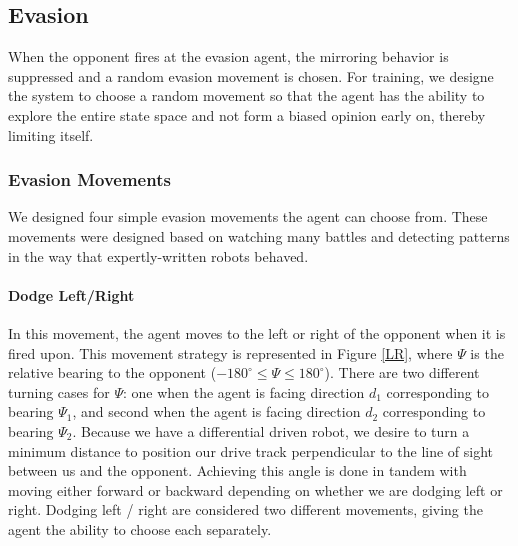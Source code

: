 \documentclass{article}
\theoremstyle{plain}
\theoremstyle{definition}
\theoremstyle{remark}
\begin{document}
\subsection*{Evasion}
When the opponent fires at the evasion agent, the mirroring behavior is suppressed and a random evasion movement is chosen. For training, we designe the system to choose a random movement so that the agent has the ability to explore the entire state space and not form a biased opinion early on, thereby limiting itself.

\subsubsection*{Evasion Movements}
We designed four simple evasion movements the agent can choose from. These movements were designed based on watching many battles and detecting patterns in the way that expertly-written robots behaved.

\paragraph{Dodge Left/Right}
In this movement, the agent moves to the left or right of the opponent when it is fired upon. This movement strategy is represented in Figure \ref{LR}, where $\Psi$ is the relative bearing to the opponent ($-180^{\circ} \leq \Psi \leq 180^{\circ}$). There are two different turning cases for $\Psi$: one when the agent is facing direction $d_1$ corresponding to bearing $\Psi_1$, and second when the agent is facing direction $d_2$ corresponding to bearing $\Psi_2$. Because we have a differential driven robot, we desire to turn a minimum distance to position our drive track perpendicular to the line of sight between us and the opponent. Achieving this angle is done in tandem with moving either forward or backward depending on whether we are dodging left or right. Dodging left / right are considered two different movements, giving the agent the ability to choose each separately.\\
\end{document}
